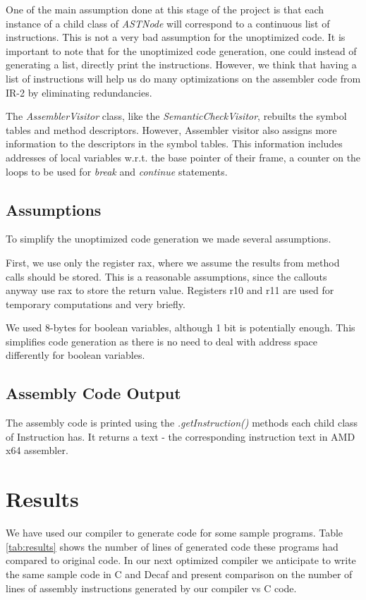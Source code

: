 \documentclass{article}[11pt]
\begin{document}
One of the main assumption done at this stage of the project is that each instance of a child class of \textit{ASTNode} will correspond to a continuous list of instructions. This is not a very bad assumption for the unoptimized code. It is important to note that for the unoptimized code generation, one could instead of generating a list, directly print the instructions. However, we think that having a list of instructions will help us do many optimizations on the assembler code from IR-2 by eliminating redundancies.

The \textit{AssemblerVisitor} class, like the \textit{SemanticCheckVisitor}, rebuilts the symbol tables and method descriptors. However, Assembler visitor also assigns more information to the descriptors in the symbol tables. This information includes addresses of local variables w.r.t. the base pointer of their frame, a counter on the loops to be used for \textit{break} and \textit{continue} statements.

\subsection{Assumptions}
To simplify the unoptimized code generation we made several assumptions.

First, we use only the register rax, where we assume the results from method calls should be stored. This is a reasonable assumptions, since the callouts anyway use rax to store the return value. Registers r10 and r11 are used for temporary computations and very briefly.

We used 8-bytes for boolean variables, although 1 bit is potentially enough. This simplifies code generation as there is no need to deal with address space differently for boolean variables.

\subsection{Assembly Code Output}
\label{sec:asm_out}
The assembly code is printed using the \textit{.getInstruction()} methods each child class of Instruction has. It returns a text - the corresponding instruction text in AMD x64 assembler.

\section{Results}
\label{sec:results}
We have used our compiler to generate code for some sample programs. Table \ref{tab:results} shows the number of lines of generated code these programs had compared to original code. In our next optimized compiler we anticipate to write the same sample code in C and Decaf and present comparison on the number of lines of assembly instructions generated by our compiler vs C code.
\end{document}
